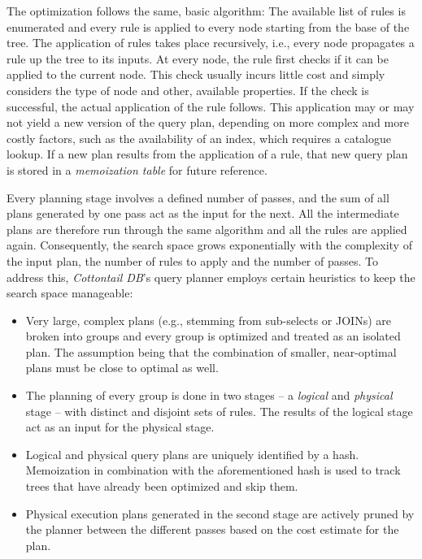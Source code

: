 The optimization follows the same, basic algorithm: The available list of rules is enumerated and every rule is applied to every node starting from the base of the tree. The application of rules takes place recursively, i.e., every node propagates a rule up the tree to its inputs. At every node, the rule first checks if it can be applied to the current node. This check usually incurs little cost and simply considers the type of node and other, available properties. If the check is successful, the actual application of the rule follows. This application may or may not yield a new version of the query plan, depending on more complex and more costly factors, such as the availability of an index, which requires a catalogue lookup. If a new plan results from the application of a rule, that new query plan is stored in a \emph{memoization table} for future reference. 

Every planning stage involves a defined number of passes, and the sum of all plans generated by one pass act as the input for the next. All the intermediate plans are therefore run through the same algorithm and all the rules are applied again. Consequently, the search space grows exponentially with the complexity of the input plan, the number of rules to apply and the number of passes. To address this, \emph{Cottontail DB}'s query planner employs certain heuristics to keep the search space manageable:

\begin{itemize}
    \item Very large, complex plans (e.g., stemming from sub-selects or JOINs) are broken into groups and every group is optimized and treated as an isolated plan. The assumption being that the combination of smaller, near-optimal plans must be close to optimal as well.
    \item The planning of every group is done in two stages -- a \emph{logical} and \emph{physical} stage -- with distinct and disjoint sets of rules. The results of the logical stage act as an input for the physical stage.
    \item Logical and physical query plans are uniquely identified by a hash. Memoization in combination with the aforementioned hash is used to track trees that have already been optimized and skip them.
    \item Physical execution plans generated in the second stage are actively pruned by the planner between the different passes based on the cost estimate for the plan.
\end{itemize}

